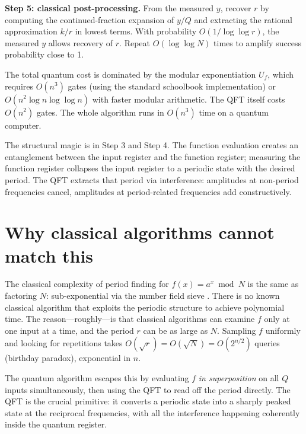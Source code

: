\textbf{Step 5: classical post-processing.} From the measured $y$, recover $r$ by computing the continued-fraction expansion of $y/Q$ and extracting the rational approximation $k/r$ in lowest terms. With probability $O(1/\log\log r)$, the measured $y$ allows recovery of $r$. Repeat $O(\log\log N)$ times to amplify success probability close to 1.

The total quantum cost is dominated by the modular exponentiation $U_f$, which requires $O(n^3)$ gates (using the standard schoolbook implementation) or $O(n^2 \log n \log\log n)$ with faster modular arithmetic. The QFT itself costs $O(n^2)$ gates. The whole algorithm runs in $O(n^3)$ time on a quantum computer.

\begin{remark}
The structural magic is in Step 3 and Step 4. The function evaluation creates an entanglement between the input register and the function register; measuring the function register collapses the input register to a periodic state with the desired period. The QFT extracts that period via interference: amplitudes at non-period frequencies cancel, amplitudes at period-related frequencies add constructively.
\end{remark}

\section{Why classical algorithms cannot match this}

The classical complexity of period finding for $f(x) = a^x \bmod N$ is the same as factoring $N$: sub-exponential via the number field sieve \citep{lenstra_factoring_1993}. There is no known classical algorithm that exploits the periodic structure to achieve polynomial time. The reason---roughly---is that classical algorithms can examine $f$ only at one input at a time, and the period $r$ can be as large as $N$. Sampling $f$ uniformly and looking for repetitions takes $O(\sqrt r) = O(\sqrt N) = O(2^{n/2})$ queries (birthday paradox), exponential in $n$.

The quantum algorithm escapes this by evaluating $f$ \emph{in superposition} on all $Q$ inputs simultaneously, then using the QFT to read off the period directly. The QFT is the crucial primitive: it converts a periodic state into a sharply peaked state at the reciprocal frequencies, with all the interference happening coherently inside the quantum register.

